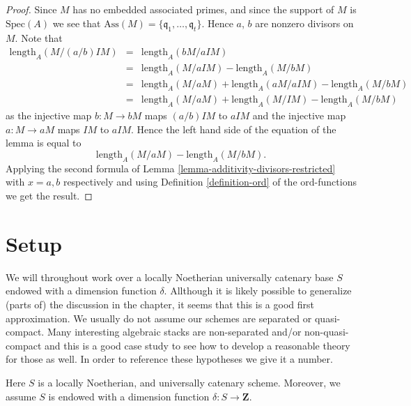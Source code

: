 \begin{proof}
Since $M$ has no embedded associated primes, and since
the support of $M$ is $\text{Spec}(A)$ we see that
$\text{Ass}(M) = \{\mathfrak q_1, \ldots, \mathfrak q_t\}$.
Hence $a$, $b$ are nonzero divisors on $M$. Note that
\begin{eqnarray*}
\text{length}_A(M/(a/b)IM)
& = &
\text{length}_A(bM/aIM) \\
& = &
\text{length}_A(M/aIM)
-
\text{length}_A(M/bM) \\
& = &
\text{length}_A(M/aM) + \text{length}_A(aM/aIM) - \text{length}_A(M/bM) \\
& = & \text{length}_A(M/aM) + \text{length}_A(M/IM) - \text{length}_A(M/bM)
\end{eqnarray*}
as the injective map $b : M \to bM$ maps $(a/b)IM$ to $aIM$
and the injective map $a : M \to aM$ maps $IM$ to $aIM$.
Hence the left hand side of the equation of the lemma is
equal to
$$
\text{length}_A(M/aM) - \text{length}_A(M/bM).
$$
Applying the second formula of
Lemma \ref{lemma-additivity-divisors-restricted} with $x = a, b$ respectively
and using Definition \ref{definition-ord} of the $\text{ord}$-functions we
get the result.
\end{proof}





















\section{Setup}
\label{section-setup}

\noindent
We will throughout work over a locally Noetherian universally
catenary base $S$ endowed with a dimension function $\delta$.
Allthough it is likely possible to generalize (parts of) the
discussion in the chapter, it seems that this is a good first
approximation. We usually do not assume our schemes are
separated or quasi-compact. Many interesting algebraic stacks
are non-separated and/or non-quasi-compact and this is a good
case study to see how to develop a reasonable theory for those as well.
In order to reference these hypotheses we give it a number.

\begin{situation}
\label{situation-setup}
Here $S$ is a locally Noetherian, and universally catenary scheme.
Moreover, we assume $S$ is endowed with a dimension function
$\delta : S \longrightarrow \mathbf{Z}$.
\end{situation}


